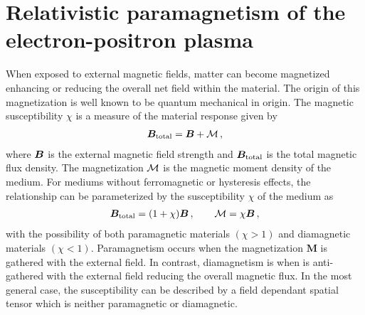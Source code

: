 \section{Relativistic paramagnetism of the electron-positron plasma}
\label{sec:magnetization}
\noindent When exposed to external magnetic fields, matter can become magnetized enhancing or reducing the overall net field within the material. The origin of this magnetization is well known to be quantum mechanical in origin. The magnetic susceptibility $\chi$ is a measure of the material response given by
\begin{gather}
 \label{totalmag:1}
 \boldsymbol{B}_{\rm total} = \boldsymbol{B} + {\cal M}\,,
\end{gather}
where $\boldsymbol{B}$ is the external magnetic field strength and $\boldsymbol{B}_{\rm total}$ is the total magnetic flux density. The magnetization ${\cal M}$ is the magnetic moment density of the medium. For mediums without ferromagnetic or hysteresis effects, the relationship can be parameterized by the susceptibility $\chi$ of the medium as
\begin{gather}
 \label{totalmag:2}
 \boldsymbol{B}_{\rm total} = (1+\chi)\boldsymbol{B}\,,\qquad {\cal M} = \chi\boldsymbol{B}\,,
\end{gather}
with the possibility of both paramagnetic materials $(\chi>1)$ and diamagnetic materials $(\chi<1)$. Paramagnetism occurs when the magnetization $\textbf{M}$ is gathered with the external field. In contrast, diamagnetism is when is anti-gathered with the external field reducing the overall magnetic flux. In the most general case, the susceptibility can be described by a field dependant spatial tensor which is neither paramagnetic or diamagnetic.

